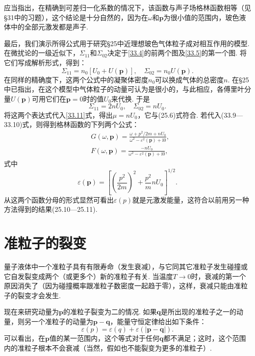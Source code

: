 应当指出，在精确到可差归一化系数的情况下，该函数与声子场格林函数相等（见§31中的习题），这个结论是十分自然的，因为在$\omega$和$\bm{p}$为很小值的范围内，玻色液体中的全部元激发都是声子.

最后，我们演示所得公式用于研究§25中近理想玻色气体粒子成对相互作用的模型. 在微扰论的一级近似下，$\Sigma_{11}$和$\Sigma_{02}$决定于\eqref{33.4}的前两个图及\eqref{33.5}的第一个图. 将它们写成解析形式，得到：
\begin{equation*}
\Sigma_{11}=n_{0}[U_{0}+U(\bm{p})],\quad\Sigma_{02}=n_{0}U(\bm{p}).
\end{equation*}
在同样的精确度下，这两个公式中的凝聚体密度$n_{0}$可以换成气体的总密度$n$. 在§25中已指出，在这个模型中气体粒子的动量可认为是很小的，与此相应，各傅里叶分量$U(\bm{p})$可用它们在$\bm{p}=0$时的值$U_{0}$来代换. 于是
\begin{equation}
\Sigma_{11}=2nU_{0},\quad\Sigma_{02}=nU_{0}.
\label{33.13}
\end{equation}
将这两个表达式代入\eqref{33.11}式，得出$\mu=nU_{0}$，它与(25.6)式符合. 若代入(33.9—33.10)式，则得到格林函数的下列两个公式：
\begin{equation}
\begin{aligned}
&G(\omega,\bm{p})=\frac{\omega+p^{2}/2m+nU_{0}}{\omega^{2}-\varepsilon^{2}(\bm{p})+\mathrm{i}0},\\
&F(\omega,\bm{p})=\frac{-nU_{0}}{\omega^{2}-\varepsilon^{2}(\bm{p})+\mathrm{i}0},
\end{aligned}
\label{33.14}
\end{equation}
式中
\begin{equation*}
\varepsilon(\bm{p})=\left[\left(\frac{p^{2}}{2m}\right)^{2}+\frac{p^{2}}{m}nU_{0}\right]^{1/2}.
\end{equation*}
从这两个函数分母的形式显然可看出$\varepsilon(p)$就是元激发能量，这符合以前用另一种方法得到的结果(25.10—25.11).

\section{准粒子的裂变}

量子液体中一个准粒子具有有限寿命（发生衰减），与它同其它准粒子发生碰撞或它自发裂变成两个（或更多个）新的准粒子有关. 当温度$T\to0$时，衰减的第一个原因消失了（因为碰撞概率跟准粒子数密度一起趋于零），这样，衰减只能由准粒子的裂变才会发生.

现在来研究动量为$\bm{p}$的准粒子裂变为二的情况. 如果$\bm{q}$是所出现的准粒子之一的动量，则另一个准粒子的动量为$\bm{p}-\bm{q}$，能量守恒定律给出如下条件：
\begin{equation}
\varepsilon(p)=\varepsilon(q)+\varepsilon(|\bm{p}-\bm{q}|).
\label{34.1}
\end{equation}
可以看出，在$\bm{p}$值的某一范围内，这个等式对于任何$\bm{q}$都不满足；这时，这个范围内的准粒子根本不会衰减（当然，假如也不能裂变为更多的准粒子）.

